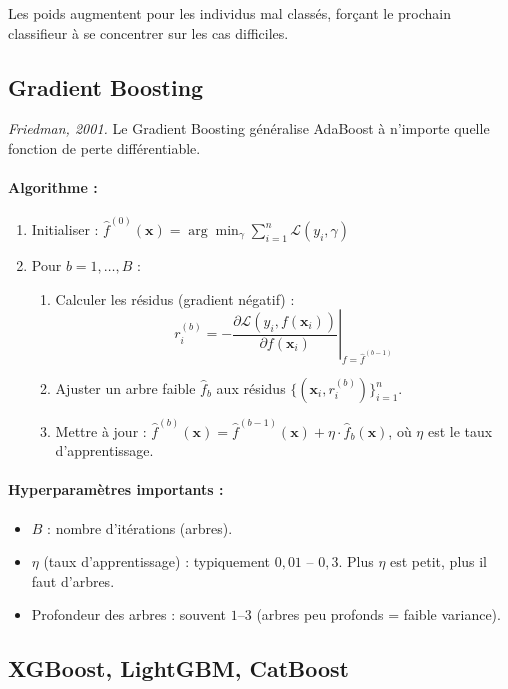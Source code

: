 \documentclass[a4paper,11pt]{article}
\begin{document}
Les poids augmentent pour les individus mal classés, forçant le prochain classifieur à se concentrer sur les cas difficiles.

\subsection{Gradient Boosting}

\textit{Friedman, 2001.} Le Gradient Boosting généralise AdaBoost à n'importe quelle fonction de perte différentiable.

\paragraph{Algorithme :}
\begin{enumerate}
    \item Initialiser : $\displaystyle \hat{f}^{(0)}(\mathbf{x}) = \arg\min_\gamma \sum_{i=1}^n \mathcal{L}(y_i, \gamma)$
    \item Pour $b = 1, \ldots, B$ :
    \begin{enumerate}
        \item Calculer les résidus (gradient négatif) :
        \[
        r_i^{(b)} = -\left.\frac{\partial \mathcal{L}(y_i, f(\mathbf{x}_i))}{\partial f(\mathbf{x}_i)}\right|_{f = \hat{f}^{(b-1)}}
        \]
        \item Ajuster un arbre faible $\hat{f}_b$ aux résidus $\{(\mathbf{x}_i, r_i^{(b)})\}_{i=1}^n$.
        \item Mettre à jour : $\hat{f}^{(b)}(\mathbf{x}) = \hat{f}^{(b-1)}(\mathbf{x}) + \eta \cdot \hat{f}_b(\mathbf{x})$, où $\eta$ est le taux d'apprentissage.
    \end{enumerate}
\end{enumerate}

\paragraph{Hyperparamètres importants :}
\begin{itemize}
    \item $B$ : nombre d'itérations (arbres).
    \item $\eta$ (taux d'apprentissage) : typiquement $0{,}01$ -- $0{,}3$. Plus $\eta$ est petit, plus il faut d'arbres.
    \item Profondeur des arbres : souvent $1$--$3$ (arbres peu profonds = faible variance).
\end{itemize}

\subsection{XGBoost, LightGBM, CatBoost}
\end{document}
